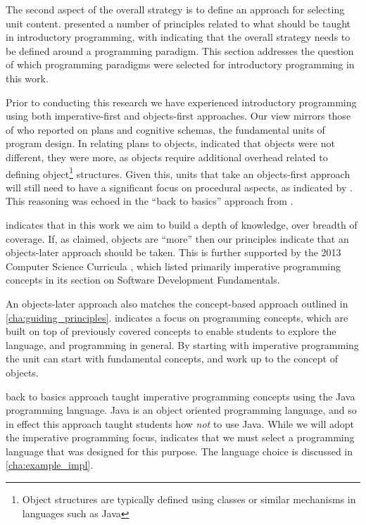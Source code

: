 The second aspect of the overall strategy is to define an approach for selecting unit content.  presented a number of principles related to what should be taught in introductory programming, with  indicating that the overall strategy needs to be defined around a programming paradigm. This section addresses the question of which programming paradigms were selected for introductory programming in this work.

Prior to conducting this research we have experienced introductory programming using both imperative-first and objects-first approaches. Our view mirrors those of \citet{Rist:1996} who reported on plans and cognitive schemas, the fundamental units of program design. In relating plans to objects, \citet{Rist:1996} indicated that objects were not different, they were more, as objects require additional overhead related to defining object\footnote{Object structures are typically defined using classes or similar mechanisms in languages such as Java} structures. Given this, units that take an objects-first approach will still need to have a significant focus on procedural aspects, as indicated by \citet{Robins:2003}. This reasoning was echoed in the ``back to basics'' approach from \citet{Reges:2006}.

 indicates that in this work we aim to build a depth of knowledge, over breadth of coverage. If, as \citet{Rist:1996} claimed, objects are ``more'' then our principles indicate that an objects-later approach should be taken. This is further supported by the 2013 Computer Science Curricula \cite{CSC2013}, which listed primarily imperative programming concepts in its section on Software Development Fundamentals.

An objects-later approach also matches the concept-based approach outlined in \cref{cha:guiding_principles}.  indicates a focus on programming concepts, which are built on top of previously covered concepts to enable students to explore the language, and programming in general. By starting with imperative programming the unit can start with fundamental concepts, and work up to the concept of objects.

\citet{Reges:2006} back to basics approach taught imperative programming concepts using the Java programming language. Java is an object oriented programming language, and so in effect this approach taught students how \emph{not} to use Java. While we will adopt the imperative programming focus,  indicates that we must select a programming language that was designed for this purpose. The language choice is discussed in \cref{cha:example_impl}.

